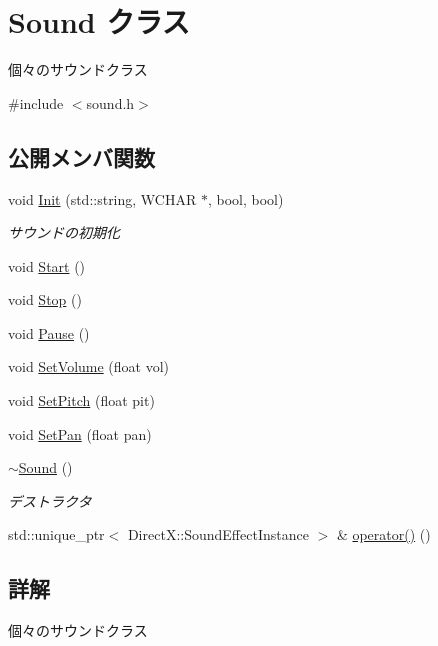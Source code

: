 \hypertarget{class_sound}{}\section{Sound クラス}
\label{class_sound}


個々のサウンドクラス  




{\ttfamily \#include $<$sound.\+h$>$}

\subsection*{公開メンバ関数}
\begin{DoxyCompactItemize}
\item 
void \mbox{\hyperlink{class_sound_a341bf468ea414e896daf3a5f7937ee12}{Init}} (std\+::string, W\+C\+H\+AR $\ast$, bool, bool)
\begin{DoxyCompactList}\small\item\em サウンドの初期化 \end{DoxyCompactList}\item 
void \mbox{\hyperlink{class_sound_ae021b518e93d7d8c6f3ea951cd4b98d8}{Start}} ()
\item 
void \mbox{\hyperlink{class_sound_a188de6836d531813da378464e392e813}{Stop}} ()
\item 
void \mbox{\hyperlink{class_sound_a4e199b4346519a4977fe94998c4a77e7}{Pause}} ()
\item 
void \mbox{\hyperlink{class_sound_a993eee69f61611ca1b4621ea0952e2c8}{Set\+Volume}} (float vol)
\item 
void \mbox{\hyperlink{class_sound_a06b9680efb2b6b41b52d9f25ac0264f1}{Set\+Pitch}} (float pit)
\item 
void \mbox{\hyperlink{class_sound_a1b066e78405656b1475849139ca24dce}{Set\+Pan}} (float pan)
\item 
\mbox{\hyperlink{class_sound_a0907389078bf740be2a5763366ad3376}{$\sim$\+Sound}} ()
\begin{DoxyCompactList}\small\item\em デストラクタ \end{DoxyCompactList}\item 
std\+::unique\+\_\+ptr$<$ Direct\+X\+::\+Sound\+Effect\+Instance $>$ \& \mbox{\hyperlink{class_sound_a0d79b20f421c0020c53b08c05b6df25b}{operator()}} ()
\end{DoxyCompactItemize}


\subsection{詳解}
個々のサウンドクラス 

